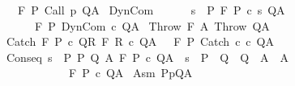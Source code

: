 \begin{isabellebody}
\ \ {\isasymLongrightarrow}\ {\isasymGamma}{\isacharcomma}{\isasymTheta}{\isasymturnstile}\isactrlbsub {\isacharslash}F\isactrlesub \ P\ {\isacharparenleft}Call\ p{\isacharparenright}\ Q{\isacharcomma}A{\isachardoublequoteclose}\isanewline
\isanewline
{\isacharbar}\ DynCom{\isacharcolon}\isanewline
\ \ \ \ \ \ {\isachardoublequoteopen}{\isasymforall}s\ {\isasymin}\ P{\isachardot}\ {\isasymGamma}{\isacharcomma}{\isasymTheta}{\isasymturnstile}\isactrlbsub {\isacharslash}F\isactrlesub \ P\ {\isacharparenleft}c\ s{\isacharparenright}\ Q{\isacharcomma}A\ \isanewline
\ \ \ \ \ \ {\isasymLongrightarrow}\ \isanewline
\ \ \ \ \ \ {\isasymGamma}{\isacharcomma}{\isasymTheta}{\isasymturnstile}\isactrlbsub {\isacharslash}F\isactrlesub \ P\ {\isacharparenleft}DynCom\ c{\isacharparenright}\ Q{\isacharcomma}A{\isachardoublequoteclose}\isanewline
\isanewline
{\isacharbar}\ Throw{\isacharcolon}\ {\isachardoublequoteopen}{\isasymGamma}{\isacharcomma}{\isasymTheta}{\isasymturnstile}\isactrlbsub {\isacharslash}F\isactrlesub \ A\ Throw\ Q{\isacharcomma}A{\isachardoublequoteclose}\isanewline
\isanewline
{\isacharbar}\ Catch{\isacharcolon}\ {\isachardoublequoteopen}{\isasymlbrakk}{\isasymGamma}{\isacharcomma}{\isasymTheta}{\isasymturnstile}\isactrlbsub {\isacharslash}F\isactrlesub \ P\ c\ Q{\isacharcomma}R{\isacharsemicolon}\ {\isasymGamma}{\isacharcomma}{\isasymTheta}{\isasymturnstile}\isactrlbsub {\isacharslash}F\isactrlesub \ R\ c\ Q{\isacharcomma}A{\isasymrbrakk}\ {\isasymLongrightarrow}\ \ {\isasymGamma}{\isacharcomma}{\isasymTheta}{\isasymturnstile}\isactrlbsub {\isacharslash}F\isactrlesub \ P\ Catch\ c\ c\ Q{\isacharcomma}A{\isachardoublequoteclose}\isanewline
\isanewline
{\isacharbar}\ Conseq{\isacharcolon}\ {\isachardoublequoteopen}{\isasymforall}s\ {\isasymin}\ P{\isachardot}\ {\isasymexists}P{\isacharprime}\ Q{\isacharprime}\ A{\isacharprime}{\isachardot}\ {\isasymGamma}{\isacharcomma}{\isasymTheta}{\isasymturnstile}\isactrlbsub {\isacharslash}F\isactrlesub \ P{\isacharprime}\ c\ Q{\isacharprime}{\isacharcomma}A{\isacharprime}\ {\isasymand}\ s\ {\isasymin}\ P{\isacharprime}\ {\isasymand}\ Q{\isacharprime}\ {\isasymsubseteq}\ Q\ {\isasymand}\ A{\isacharprime}\ {\isasymsubseteq}\ A\ \isanewline
\ \ \ \ \ \ \ \ \ \ \ {\isasymLongrightarrow}\ {\isasymGamma}{\isacharcomma}{\isasymTheta}{\isasymturnstile}\isactrlbsub {\isacharslash}F\isactrlesub \ P\ c\ Q{\isacharcomma}A{\isachardoublequoteclose}\isanewline
\isanewline
\isanewline
{\isacharbar}\ Asm{\isacharcolon}\ {\isachardoublequoteopen}{\isasymlbrakk}{\isacharparenleft}P{\isacharcomma}p{\isacharcomma}Q{\isacharcomma}A{\isacharparenright}\ {\isasymin}\ {\isasymTheta}{\isasymrbrakk}\isanewline

\end{isabellebody}
